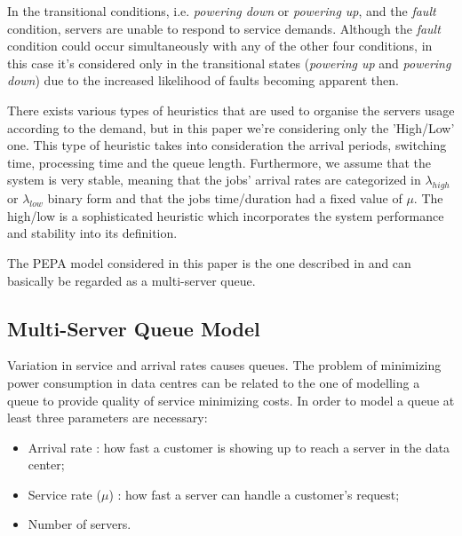\documentclass{article}
\begin{document}
In the transitional conditions, i.e. \textit{powering down} or \textit{powering up}, and the \textit{fault} condition, servers are unable to respond to service demands.\newline
Although the \textit{fault} condition could occur simultaneously with any of the other
four conditions, in this case it's considered only in the transitional
states (\textit{powering up} and \textit{powering down}) due to the increased likelihood of
faults becoming apparent then.\newline

\par\noindent There exists various types of heuristics that are used to organise the servers usage according to the demand, but in this paper we're considering only the 'High/Low' one.\newline
This type of heuristic takes into consideration the arrival periods, switching time, processing time
and the queue length. Furthermore, we assume that the system is very stable, meaning that the jobs' arrival rates are categorized in \(\lambda_{high}\) or \(\lambda_{low}\) binary form and that the jobs time/duration had a fixed value of \(\mu\).\newline
The high/low is a sophisticated heuristic which incorporates the system performance and stability into its definition.\newline

\par\noindent The PEPA model considered in this paper is the one described in \cite{projectPaper} and can basically be regarded as a multi-server queue.

\subsection{Multi-Server Queue Model}
Variation in service and arrival rates causes queues. The problem of minimizing power consumption in data centres can be related to the one of modelling a queue to provide quality of service minimizing costs.
In order to model a queue at least three parameters are necessary:

\begin{itemize}
    \item Arrival rate : how fast a customer is showing up to reach a server in the data center;
    \item Service rate (\(\mu\)) : how fast a server can handle a customer's request;
    \item Number of servers.
\end{itemize}
\end{document}
